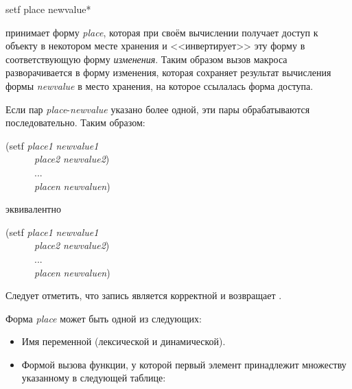 \begin{defmac}
setf {place newvalue}*

 принимает форму \emph{place}, которая
при своём вычислении получает доступ к объекту в некотором месте хранения и
<<инвертирует>> эту форму в соответствующую форму \emph{изменения}.
Таким образом вызов макроса  разворачивается в форму изменения,
которая сохраняет результат вычисления формы \emph{newvalue} в место хранения,
на которое ссылалась форма доступа.

Если пар \emph{place}-\emph{newvalue} указано более одной, эти пары
обрабатываются последовательно. Таким образом:
\begin{lisp}
(setf \emph{place1} \emph{newvalue1} \\
~~~~~~\emph{place2} \emph{newvalue2}) \\
~~~~~~... \\
~~~~~~\emph{placen} \emph{newvaluen})
\end{lisp}
эквивалентно
\begin{lisp}
(setf \emph{place1} \emph{newvalue1} \\
~~~~~~\emph{place2} \emph{newvalue2}) \\
~~~~~~... \\
~~~~~~\emph{placen} \emph{newvaluen})
\end{lisp}
Следует отметить, что запись  является корректной и возвращает {\nil}.

Форма \emph{place} может быть одной из следующих:
\begin{itemize}

\item
Имя переменной (лексической и динамической).

\item
Формой вызова функции, у которой первый элемент принадлежит множеству указанному
в следующей таблице:


\end{itemize}
\end{defmac}
